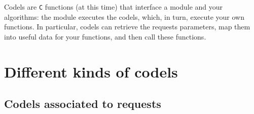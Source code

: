 %
%
%
%
%
%
%

Codels are \texttt{C} functions (at this time) that interface a module and
your algorithms: the module executes the codels, which, in turn, execute
your   own functions. In   particular,  codels can retrieve  the requests
parameters,  map them into useful data  for your functions, and then call
these functions.

\section{Different kinds of codels}

\subsection{Codels associated to requests}

